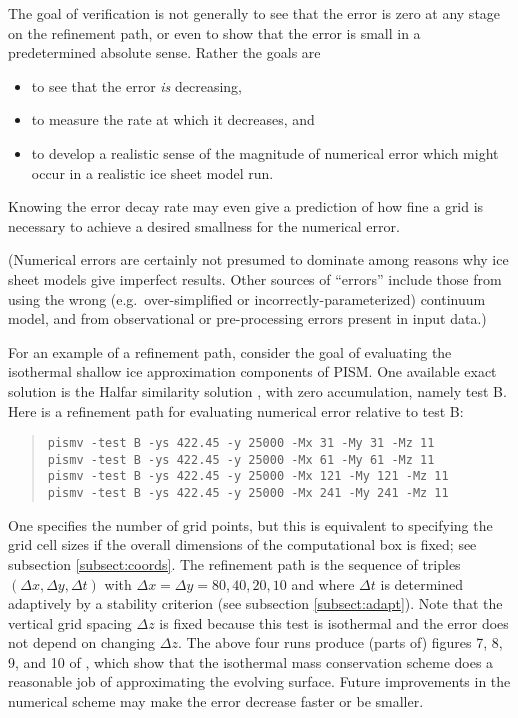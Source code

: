 The goal of verification is not generally to see that the error is zero at any stage on the refinement path, or even to show that the error is small in a predetermined absolute sense.  Rather the goals are
\begin{itemize}
\item to see that the error \emph{is} decreasing,
\item to measure the rate at which it decreases, and
\item to develop a realistic sense of the magnitude of numerical error which might occur in a realistic ice sheet model run.
\end{itemize}
Knowing the error decay rate may even give a prediction of how fine a grid is necessary to achieve a desired smallness for the numerical error.

(Numerical errors are certainly not presumed to dominate among reasons why ice sheet models give imperfect results.  Other sources of ``errors'' include those from using the wrong (e.g.~over-simplified or incorrectly-parameterized) continuum model, and from observational or pre-processing errors present in input data.)

For an example of a refinement path, consider the goal of evaluating the isothermal shallow ice approximation components of PISM.  One available exact solution is the Halfar similarity solution \cite{Halfar83}, with zero accumulation, namely test B.  Here is a refinement path for evaluating numerical error relative to test B:
\begin{quote}\small
\begin{verbatim}
pismv -test B -ys 422.45 -y 25000 -Mx 31 -My 31 -Mz 11
pismv -test B -ys 422.45 -y 25000 -Mx 61 -My 61 -Mz 11
pismv -test B -ys 422.45 -y 25000 -Mx 121 -My 121 -Mz 11
pismv -test B -ys 422.45 -y 25000 -Mx 241 -My 241 -Mz 11
\end{verbatim}
\normalsize\end{quote}
One specifies the number of grid points, but this is equivalent to specifying the grid cell sizes if the overall dimensions of the computational box is fixed; see subsection \ref{subsect:coords}.  The refinement path is the sequence of triples $(\Delta x,\Delta y,\Delta t)$ with $\Delta x = \Delta y = 80,40,20,10$ and where $\Delta t$ is determined adaptively by a stability criterion (see subsection \ref{subsect:adapt}).  Note that the vertical grid spacing $\Delta z$ is fixed because this test is isothermal and the error does not depend on changing $\Delta z$.  The above four runs produce (parts of) figures 7, 8, 9, and 10 of \cite{BLKCB}, which show that the isothermal mass conservation scheme does a reasonable job of approximating the evolving surface.  Future improvements in the numerical scheme may make the error decrease faster or be smaller.


